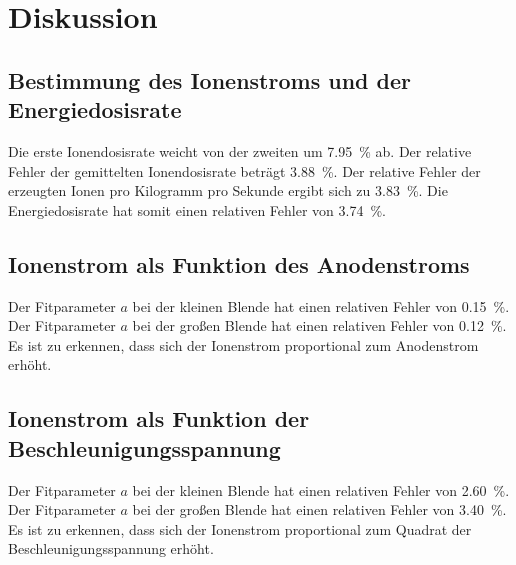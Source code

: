 \section{Diskussion}
\label{sec:Diskussion}

\subsection{Bestimmung des Ionenstroms und der Energiedosisrate}

Die erste Ionendosisrate weicht von der zweiten um \SI{7.95}{\percent} ab. 
Der relative Fehler der gemittelten Ionendosisrate beträgt \SI{3.88}{\percent}. 
Der relative Fehler der erzeugten Ionen pro Kilogramm pro Sekunde ergibt sich zu \SI{3.83}{\percent}. Die Energiedosisrate hat somit einen relativen Fehler von \SI{3.74}{\percent}. 

\subsection{Ionenstrom als Funktion des Anodenstroms}
Der Fitparameter $a$ bei der kleinen Blende hat einen relativen Fehler von \SI{0.15}{\percent}. 
Der Fitparameter $a$ bei der großen Blende hat einen relativen Fehler von \SI{0.12}{\percent}. 
Es ist zu erkennen, dass sich der Ionenstrom proportional zum Anodenstrom erhöht. 
\subsection{Ionenstrom als Funktion der Beschleunigungsspannung}
Der Fitparameter $a$ bei der kleinen Blende hat einen relativen Fehler von \SI{2.60}{\percent}. 
Der Fitparameter $a$ bei der großen Blende hat einen relativen Fehler von \SI{3.40}{\percent}. 
Es ist zu erkennen, dass sich der Ionenstrom proportional zum Quadrat der Beschleunigungsspannung erhöht. 
